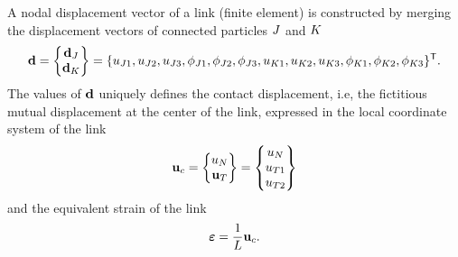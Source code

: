 A nodal displacement vector of a link (finite element) is constructed by merging the displacement vectors of connected particles $J$ and $K$
\begin{equation}
	\linkNodalDsplVector
	=
	\begin{Bmatrix}
		\nodalDsplVector_\particleA
		\\
		\nodalDsplVector_\particleB
	\end{Bmatrix}
	=
	\{
		\displacement_{\particleA1},
		\displacement_{\particleA2},
		\displacement_{\particleA3},
		\rotation_{\particleA1},
		\rotation_{\particleA2},
		\rotation_{\particleA3},
		\displacement_{\particleB1},
		\displacement_{\particleB2},
		\displacement_{\particleB3},
		\rotation_{\particleB1},
		\rotation_{\particleB2},
		\rotation_{\particleB3}
	\}\T
	.
	\label{eqMacroPropertiesElasticLinkNodalDsplVectorDef}
\end{equation}
The values of $\linkNodalDsplVector$ uniquely defines the contact displacement, i.e, the fictitious mutual displacement at the center of the link, expressed in the local coordinate system of the link
\begin{equation}
	\displacementVector_\contact = \begin{Bmatrix}
		\displacement_\normalComponent \\
		\displacementVector_\shearComponent
	\end{Bmatrix}
	= \begin{Bmatrix}
		\displacement_\normalComponent \\
		\displacement_{\shearComponent1} \\
		\displacement_{\shearComponent2} \\
	\end{Bmatrix}
\end{equation}
and the equivalent strain of the link
\begin{equation}
	\linkStrainVector = \frac{1}{\linkLength}\displacementVector_\contact
	.
\end{equation}

